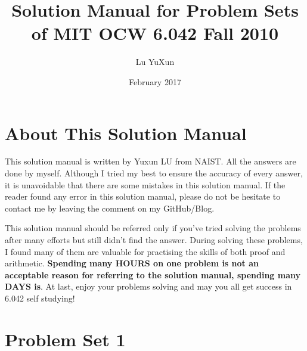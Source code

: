 \documentclass{article}
\title{Solution Manual for Problem Sets of MIT OCW 6.042 Fall 2010}
\author{Lu YuXun}
\date{February 2017}
\begin{document}
\maketitle
\section{About This Solution Manual}
This solution manual is written by Yuxun LU from NAIST. All the answers are done by myself. Although I tried my best to ensure the accuracy of every answer, it is unavoidable that there are some mistakes in this solution manual. If the reader found any error in this solution manual, please do not be hesitate to contact me by leaving the comment on my GitHub/Blog.

This solution manual should be referred only if you've tried solving the problems after many efforts but still didn't find the answer. During solving these problems, I found many of them are valuable for practising the skills of both proof and  arithmetic. \textbf{Spending many HOURS on one problem is not an acceptable reason for referring to the solution manual, spending many DAYS is}. At last, enjoy your problems solving and may you all get success in 6.042 self studying!
\section{Problem Set 1}
\end{document}
